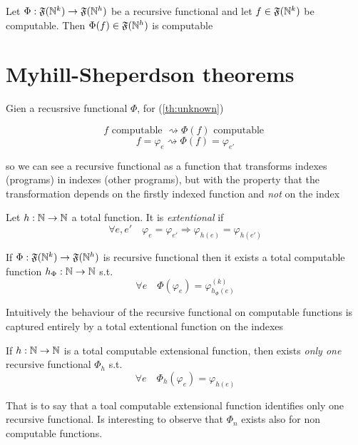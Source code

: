 \begin{theorem}\label{th:unknown}
  Let $\Phi : \mathfrak{F}(\mathbb{N}^k) \rightarrow \mathfrak{F}(\mathbb{N}^h)$
  be a recursive functional and let $f \in \mathfrak{F}(\mathbb{N}^k)$ be
  computable. Then $\Phi(f) \in \mathfrak{F}(\mathbb{N}^h)$ is computable
\end{theorem}

\section{Myhill-Sheperdson theorems}
Gien a recusrsive functional $\Phi$, for (\ref{th:unknown})

\[
  f \mbox{ computable } \rightsquigarrow \Phi(f) \mbox{ computable }
\]
\[
  f = \varphi_e \rightsquigarrow \Phi(f) = \varphi_{e'}
\]

so we can see a recursive functional as a function that transforms
indexes (programs) in indexes (other programs), but with the property
that the transformation depends on the firstly indexed function and
\emph{not} on the index

\begin{definition}
  Let $h : \mathbb{N} \rightarrow \mathbb{N}$ a total function. It is \emph{extentional} if
  \[
    \forall e,e' \quad \varphi_e = \varphi_{e'} \Rightarrow
    \varphi_{h(e)} = \varphi_{h(e')}
  \]
\end{definition}

\begin{theorem}
  If $\Phi : \mathfrak{F}(\mathbb{N}^k) \rightarrow \mathfrak{F}(\mathbb{N}^h)$ is
  recursive functional then it exists a total computable function
  $h_\Phi : \mathbb{N} \rightarrow \mathbb{N}$ s.t.
  \[
    \forall e \quad \Phi(\varphi_e) = \varphi_{h_\Phi(e)}^{(k)}
  \]
\end{theorem}

Intuitively the behaviour of the recursive functional on computable
functions is captured entirely by a total extentional function on the
indexes

\begin{theorem}
  If $h : \mathbb{N} \rightarrow \mathbb{N}$ is a total computable extensional function, then
  exists \emph{only one} recursive functional $\Phi_h$ s.t.
  \[
    \forall e \quad \Phi_h(\varphi_e) = \varphi_{h(e)}
  \]
\end{theorem}
That is to say that a toal computable extensional function identifies
only one recursive functional.  Is interesting to observe that
$\Phi_n$ exists also for non computable functions.

